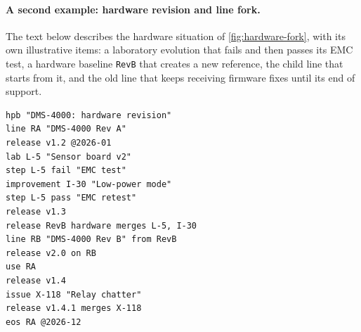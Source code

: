 \paragraph{A second example: hardware revision and line fork.}
The text below describes the hardware situation of
\cref{fig:hardware-fork}, with its own illustrative items: a laboratory
evolution that fails and then passes its EMC test, a hardware baseline
\texttt{RevB} that creates a new reference, the child line that starts from
it, and the old line that keeps receiving firmware fixes until its end of
support.

\begin{lstlisting}[style=hpb,basicstyle=\ttfamily\footnotesize]
hpb "DMS-4000: hardware revision"
line RA "DMS-4000 Rev A"
release v1.2 @2026-01
lab L-5 "Sensor board v2"
step L-5 fail "EMC test"
improvement I-30 "Low-power mode"
step L-5 pass "EMC retest"
release v1.3
release RevB hardware merges L-5, I-30
line RB "DMS-4000 Rev B" from RevB
release v2.0 on RB
use RA
release v1.4
issue X-118 "Relay chatter"
release v1.4.1 merges X-118
eos RA @2026-12
\end{lstlisting}

\clearpage

